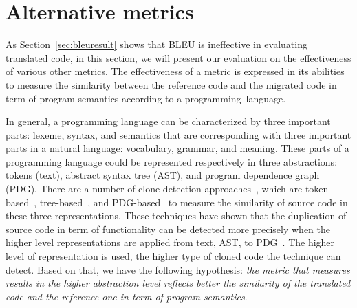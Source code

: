 \section{Alternative metrics}
\label{sec:alternatives}
%

As Section~\ref{sec:bleuresult} shows that BLEU is ineffective in
evaluating translated code, in this section, we will present our
evaluation on the effectiveness of various other metrics. The
effectiveness of a metric is expressed in its abilities to measure the
similarity between the reference code and the migrated code in term of
program semantics according to a programming~language.


In general, a programming language can be characterized by three
important parts: lexeme, syntax, and semantics that are corresponding
with three important parts in a natural language: vocabulary, grammar,
and meaning.
These parts of a programming language could be represented respectively in three 
abstractions: tokens (text), abstract syntax tree (AST), and program 
dependence graph (PDG).
%
There are a number of clone detection approaches~\cite{clone-tse07},
which are token-based~\cite{ccfinder},
tree-based~\cite{baxter98,deckard}, and PDG-based~\cite{deckard2} to
measure the similarity of source code in these three representations.
These techniques have shown that the duplication of source code in
term of functionality can be detected more precisely when the higher
level representations are applied from text, AST, to
PDG~\cite{clone-tse07,deckard2}. The higher level of representation is
used, the higher type of cloned code the technique can detect.
Based on that, we have the following hypothesis: \textit{the metric
  that measures results in the higher abstraction level reflects
  better the similarity of the translated code and the reference one
  in term of program semantics}.

